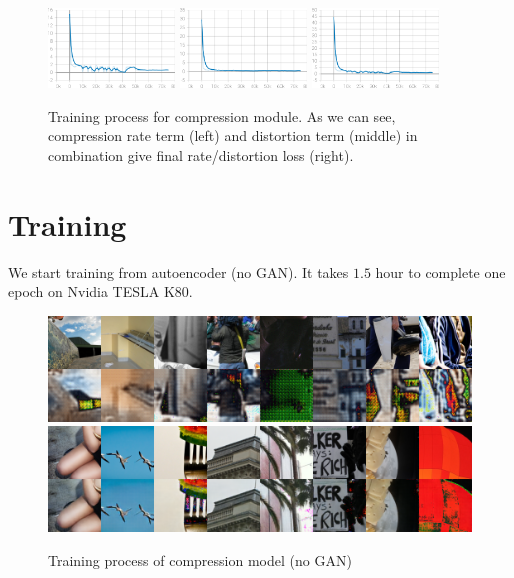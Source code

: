 \begin{figure}[!ht]
    \centering
    \includegraphics[width=0.3\textwidth]{figure/weighted_compression_weighted_rate.png}
    \includegraphics[width=0.3\textwidth]{figure/weighted_compression_weighted_distortion.png}
    \includegraphics[width=0.3\textwidth]{figure/weighted_compression_weighted_R_D.png}
    \caption{Training process for compression module. As we can see, compression rate term (left) and distortion term (middle) in combination give final rate/distortion loss (right).}
    \label{compession-losses}
\end{figure}

\section{Training}

We start training from autoencoder (no GAN). It takes $1.5$ hour to complete one epoch on Nvidia TESLA K80.

\begin{figure}[!ht]
    \label{training-compression-examples}
    \centering
    \includegraphics[width=\textwidth]{figure/step_1000.png}
    \includegraphics[width=\textwidth]{figure/step_15000.png}
    \caption{Training process of compression model (no GAN)}
\end{figure}

